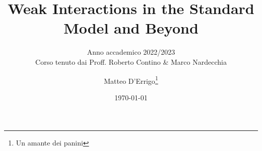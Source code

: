 \documentclass[
	fontsize=10pt, %
	twoside=false, %
	numbers=noenddot, %
]{kaobook}
\begin{document}

\titlehead{The \texttt{kaobook} class}
\subject{Appunti del corso di}

\title[Weak Interactions in the Standard Model and Beyond]{Weak Interactions in the Standard Model and Beyond}
\subtitle{Anno accademico 2022/2023\\Corso tenuto dai Proff. Roberto Contino \& Marco Nardecchia}

\author[Matteo D'Errigo]{Matteo D'Errigo\thanks{Un amante dei panini}}

\date{\today}



\frontmatter %




\makeatletter
\uppertitleback{\@titlehead} %
\end{document}
